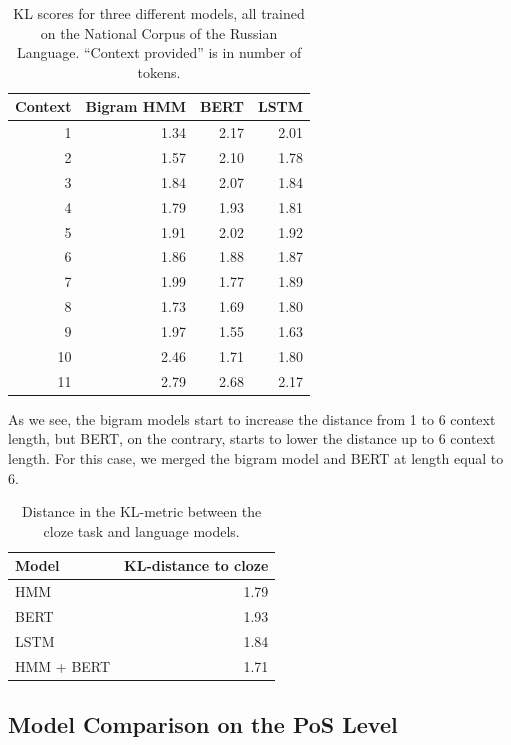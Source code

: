 \documentclass[a4paper]{article}
\begin{document}
\begin{table}
\label{tbl:kl-scores}
\centering

\caption{KL scores for three different models, all trained on the
National Corpus of the Russian Language. ``Context provided'' is in number
of tokens.
\newline}

\begin{tabular}{rrrr}
\textbf{Context} &
\textbf{Bigram HMM} &
\textbf{BERT} &
\textbf{LSTM} \\
\hline
1 &
1.34 &
2.17 &
2.01 \\
2 &
1.57 &
2.10 &
1.78 \\
3 &
1.84 &
2.07 &
1.84 \\
4 &
1.79 &
1.93 &
1.81 \\
5 &
1.91 &
2.02 &
1.92 \\
6 &
1.86 &
1.88 &
1.87 \\
7 &
1.99 &
1.77 &
1.89 \\
8 &
1.73 &
1.69 &
1.80 \\
9 &
1.97 &
1.55 &
1.63 \\
10 &
2.46 &
1.71 &
1.80 \\
11 &
2.79 &
2.68 &
2.17
\end{tabular}
\end{table}

As we see, the bigram models start to increase the distance from 1 to 6 context length, but BERT, on the contrary, starts to lower the distance up to 6 context length. For this case, we merged the bigram model and BERT at length equal to 6.

\begin{table}
\label{tbl:lm-distances}
\centering

\caption{Distance in the KL-metric between the cloze task and language models.
\newline}

\begin{tabular}{lr}
\textbf{Model} &
\textbf{KL-distance to cloze} \\
\hline
   HMM & 1.79
\\ BERT & 1.93
\\ LSTM & 1.84
\\ HMM + BERT & 1.71
\end{tabular}
\end{table}

\subsection{Model Comparison on the PoS Level}
\end{document}
